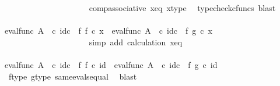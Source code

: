 \begin{isabellebody}
\ \ \ \ \ \ \ \ \ \ \ \ \ \ \ \ \ \ \ \ \isamarkupfalse%
\ comp{\isacharunderscore}{\kern0pt}associative{}\ x{\isacharunderscore}{\kern0pt}eq\ x{\isacharunderscore}{\kern0pt}type\ \isamarkupfalse%
\ {\isacharparenleft}{\kern0pt}typecheck{\isacharunderscore}{\kern0pt}cfuncs{\isacharcomma}{\kern0pt}\ blast{\isacharparenright}{\kern0pt}\isanewline
\ \ \ \ \ \ \ \ \ \ \ \ \ \ \ \ \ \ \isamarkupfalse%
\ \isamarkupfalse%
\ {\isachardoublequoteopen}{\isacharparenleft}{\kern0pt}eval{\isacharunderscore}{\kern0pt}func\ A\ {\isasymOmega}\ {\isasymcirc}\isactrlsub c\ id\isactrlsub c\ {\isasymOmega}\ {\isasymtimes}\isactrlsub f\ f{\isacharparenright}{\kern0pt}\ {\isasymcirc}\isactrlsub c\ x\ {\isacharequal}{\kern0pt}\ {\isacharparenleft}{\kern0pt}eval{\isacharunderscore}{\kern0pt}func\ A\ {\isasymOmega}\ {\isasymcirc}\isactrlsub c\ id\isactrlsub c\ {\isasymOmega}\ {\isasymtimes}\isactrlsub f\ g{\isacharparenright}{\kern0pt}\ {\isasymcirc}\isactrlsub c\ x{\isachardoublequoteclose}\isanewline
\ \ \ \ \ \ \ \ \ \ \ \ \ \ \ \ \ \ \ \ \isamarkupfalse%
\ {\isacharparenleft}{\kern0pt}simp\ add{\isacharcolon}{\kern0pt}\ calculation\ x{\isacharunderscore}{\kern0pt}eq{\isacharparenright}{\kern0pt}\isanewline
\ \ \ \ \ \ \ \ \ \ \ \ \ \ \ \ \isamarkupfalse%
\isanewline
\ \ \ \ \ \ \ \ \ \ \ \ \ \ \isamarkupfalse%
\isanewline
\ \ \ \ \ \ \ \ \ \ \ \ \isamarkupfalse%
\isanewline
\ \ \ \ \ \ \ \ \ \ \ \ \isamarkupfalse%
\ \isamarkupfalse%
\ {\isachardoublequoteopen}eval{\isacharunderscore}{\kern0pt}func\ A\ {\isasymOmega}\ {\isasymcirc}\isactrlsub c\ id\isactrlsub c\ {\isasymOmega}\ {\isasymtimes}\isactrlsub f\ f\ {\isasymcirc}\isactrlsub c\ id{\isacharunderscore}{\kern0pt}{}\ {\isacharequal}{\kern0pt}\ eval{\isacharunderscore}{\kern0pt}func\ A\ {\isasymOmega}\ {\isasymcirc}\isactrlsub c\ id\isactrlsub c\ {\isasymOmega}\ {\isasymtimes}\isactrlsub f\ g\ {\isasymcirc}\isactrlsub c\ id{\isacharunderscore}{\kern0pt}{}{\isachardoublequoteclose}\isanewline
\ \ \ \ \ \ \ \ \ \ \ \ \ \ \isamarkupfalse%
\ \ f{\isacharunderscore}{\kern0pt}type\ g{\isacharunderscore}{\kern0pt}type\ same{\isacharunderscore}{\kern0pt}evals{\isacharunderscore}{\kern0pt}equal\ \isamarkupfalse%
\ blast\isanewline
\ \ \ \ \ \ \ \ \ \ \isamarkupfalse%
\isanewline
\ \ \ \ \ \ \ \ \isamarkupfalse%
\isanewline
\ \ \ \ \ \ \isamarkupfalse%
\isanewline

\end{isabellebody}
